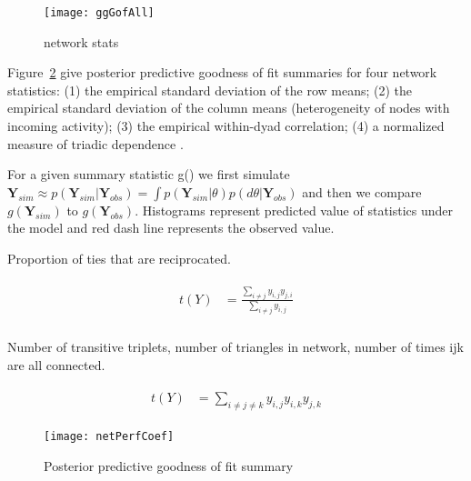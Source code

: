 \begin{figure}[ht]
	\centering
	\texttt{[image: ggGofAll]}
	\caption{network stats }
	\label{fig:gofAll}
\end{figure}

Figure~\ref{fig:ergmAmePerf} give posterior predictive goodness of fit summaries for four network statistics: (1) the empirical standard deviation of the row means; (2) the empirical standard deviation of the column means (heterogeneity of nodes with incoming activity); (3) the empirical within-dyad correlation; (4) a normalized measure of triadic dependence \citep{hoff:etal:2015}. 

For a given summary statistic g() we first simulate $\mathbf{Y}_{sim} \approx p(\mathbf{Y}_{sim} | \mathbf{Y}_{obs}) = \int p(\mathbf{Y}_{sim} | \theta) p(d \theta | \mathbf{Y}_{obs})$ and then we compare $g(\mathbf{Y}_{sim})$ to $g(\mathbf{Y}_{obs})$. Histograms represent predicted value of statistics under the model and red dash line represents the observed value. 

Proportion of ties that are reciprocated. 

\begin{align}
\begin{aligned}
t(Y) &= \frac{ \sum_{i \neq j}y_{i,j} y_{j,i} }{ \sum_{i \neq j} y_{i,j} } \\
\end{aligned}
\end{align}

Number of transitive triplets, number of triangles in network, number of times ijk are all connected.

\begin{align}
\begin{aligned}
t(Y) &= \sum_{i \neq j \neq k} y_{i,j} y_{i,k} y_{j,k}
\end{aligned}
\end{align}

\begin{figure}[ht]
	\centering
	\texttt{[image: netPerfCoef]}
	\caption{Posterior predictive goodness of fit summary}
	\label{fig:ergmAmePerf}
\end{figure}
\FloatBarrier